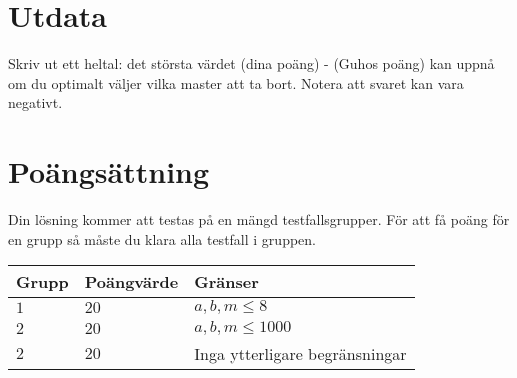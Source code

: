 \section*{Utdata}
Skriv ut ett heltal: det största värdet (dina poäng) - (Guhos poäng) kan uppnå om du optimalt väljer vilka master att ta bort. Notera att svaret kan vara negativt.

\section*{Poängsättning}
Din lösning kommer att testas på en mängd testfallsgrupper.
För att få poäng för en grupp så måste du klara alla testfall i gruppen.

\noindent
\begin{tabular}{| l | l | p{12cm} |}
  \hline
  Grupp & Poängvärde & Gränser \\ \hline
  $1$   & $20$       & $a,b,m \leq 8$\\ \hline
  $2$   & $20$       & $a,b,m \leq 1000$  \\ \hline
  $2$   & $20$       & Inga ytterligare begränsningar  \\ \hline
\end{tabular}
